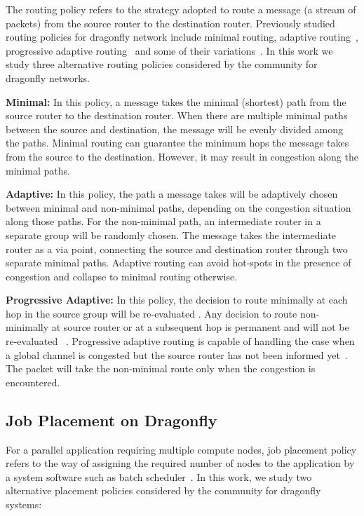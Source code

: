 The routing policy refers to the strategy adopted to route a message (a stream of packets) from the source router to the destination router. Previously studied routing policies for dragonfly network include minimal routing, adaptive routing~\cite{dally-dragonfly}, progressive adaptive routing~\cite{jiang} and some of their variations~\cite{won-prog-adaptive}. In this work we study three alternative routing policies considered by the community for dragonfly networks.

\textbf{Minimal:} In this policy, a message takes the minimal (shortest) path from the source router to the destination router. When there are multiple minimal paths between the source and destination, the message will be evenly divided among the paths. Minimal routing can guarantee the minimum hops the message takes from the source to the destination. However, it may result in congestion along the minimal paths. 

\textbf{Adaptive:} In this policy, the path a message takes will be adaptively chosen between minimal and non-minimal paths, depending on the congestion situation along those paths. For the non-minimal path, an intermediate router in a separate group will be randomly chosen. The message takes the intermediate router as a via point, connecting the source and destination router through two separate minimal paths. Adaptive routing can avoid hot-spots in the presence of congestion and collapse to minimal routing otherwise. 

\textbf{Progressive Adaptive:} In this policy, the decision to route minimally at each hop in the source group will be re-evaluated . Any decision to route non-minimally at source router or at a subsequent hop is permanent and will not be re-evaluated~\cite{jiang} . Progressive adaptive routing is capable of handling the case when a global channel is congested but the source router has not been informed yet~\cite{jiang}. The packet will take the non-minimal route only when the congestion is encountered. 

\subsection{Job Placement on Dragonfly}
\label{sec:placement-schemes}

For a parallel application requiring multiple compute nodes, job placement policy refers to the way of assigning the required number of nodes to the application by a system software such as batch scheduler~\cite{xu-cluster14}. In this work, we study two alternative placement policies considered by the community for dragonfly systems: 

